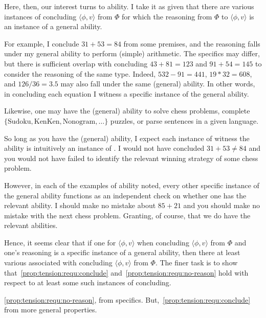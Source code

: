\begin{note}[Ability]
  Here, then, our interest turns to ability.
  I take it as given that there are various instances of concluding \(\langle \phi,v \rangle\) from \(\Phi\) for which the reasoning from \(\Phi\) to \(\langle \phi,v \rangle\) is an instance of a general ability.

  For example, I conclude \(31 + 53 = 84\) from some premises, and the reasoning falls under my general ability to perform (simple) arithmetic.
  The specifics may differ, but there is sufficient overlap with concluding \(43 + 81 = 123\) and \(91 + 54 = 145\) to consider the reasoning of the same type.
  Indeed, \(532 - 91 = 441\), \(19 * 32 = 608\), and \(126/36 = 3.5\) may also fall under the same (general) ability.
  In other words, in concluding each equation I witness a specific instance of the general ability.

  Likewise, one may have the (general) ability to solve chess problems, complete \(\{ \text{Sudoku}, \text{KenKen}, \text{Nonogram}, \dots\}\) puzzles, or parse sentences in a given language.

  So long as you have the (general) ability, I expect each instance of witness the ability is intuitively an instance of \csN{}.
  I would not have concluded \(31 + 53 \ne 84\) and you would not have failed to identify the relevant winning strategy of some chess problem.

  However, in each of the examples of ability noted, every other specific instance of the general ability functions as an independent check on whether one has the relevant ability.
  I should make no mistake about \(85 + 21\) and you should make no mistake with the next chess problem.
  Granting, of course, that we do have the relevant abilities.

  Hence, it seems clear that if one \csV{} for \(\langle \phi,v \rangle\) when concluding \(\langle \phi,v \rangle\) from \(\Phi\) and one's reasoning is a specific instance of a general ability, then there at least various  associated with concluding \(\langle \phi,v \rangle\) from \(\Phi\).
  The finer task is to show that~\autoref{prop:tension:requ:conclude} and~\autoref{prop:tension:requ:no-reason} hold with respect to at least some such instances of concluding.
\end{note}

\begin{note}
  \autoref{prop:tension:requ:no-reason}, from specifics.
  But,~\autoref{prop:tension:requ:conclude} from more general properties.
\end{note}


